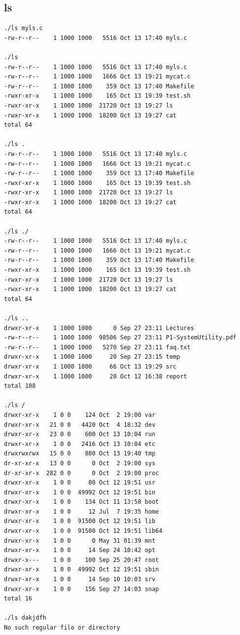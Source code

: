 \documentclass[11pt]{article}
\begin{document}
\subsection{ls}
\label{sec:org6e01d4c}
\begin{verbatim}
./ls myls.c
-rw-r--r--    1 1000 1000   5516 Oct 13 17:40 myls.c

./ls
-rw-r--r--    1 1000 1000   5516 Oct 13 17:40 myls.c
-rw-r--r--    1 1000 1000   1666 Oct 13 19:21 mycat.c
-rw-r--r--    1 1000 1000    359 Oct 13 17:40 Makefile
-rwxr-xr-x    1 1000 1000    165 Oct 13 19:39 test.sh
-rwxr-xr-x    1 1000 1000  21720 Oct 13 19:27 ls
-rwxr-xr-x    1 1000 1000  18200 Oct 13 19:27 cat
total 64

./ls .
-rw-r--r--    1 1000 1000   5516 Oct 13 17:40 myls.c
-rw-r--r--    1 1000 1000   1666 Oct 13 19:21 mycat.c
-rw-r--r--    1 1000 1000    359 Oct 13 17:40 Makefile
-rwxr-xr-x    1 1000 1000    165 Oct 13 19:39 test.sh
-rwxr-xr-x    1 1000 1000  21720 Oct 13 19:27 ls
-rwxr-xr-x    1 1000 1000  18200 Oct 13 19:27 cat
total 64

./ls ./
-rw-r--r--    1 1000 1000   5516 Oct 13 17:40 myls.c
-rw-r--r--    1 1000 1000   1666 Oct 13 19:21 mycat.c
-rw-r--r--    1 1000 1000    359 Oct 13 17:40 Makefile
-rwxr-xr-x    1 1000 1000    165 Oct 13 19:39 test.sh
-rwxr-xr-x    1 1000 1000  21720 Oct 13 19:27 ls
-rwxr-xr-x    1 1000 1000  18200 Oct 13 19:27 cat
total 64

./ls ..
drwxr-xr-x    1 1000 1000      0 Sep 27 23:11 Lectures
-rw-r--r--    1 1000 1000  98506 Sep 27 23:11 P1-SystemUtility.pdf
-rw-r--r--    1 1000 1000   5270 Sep 27 23:11 faq.txt
drwxr-xr-x    1 1000 1000     20 Sep 27 23:15 temp
drwxr-xr-x    1 1000 1000     66 Oct 13 19:29 src
drwxr-xr-x    1 1000 1000     20 Oct 12 16:38 report
total 108

./ls /
drwxr-xr-x    1 0 0    124 Oct  2 19:00 var
drwxr-xr-x   21 0 0   4420 Oct  4 18:32 dev
drwxr-xr-x   23 0 0    600 Oct 13 10:04 run
drwxr-xr-x    1 0 0   2416 Oct 13 10:04 etc
drwxrwxrwx   15 0 0    880 Oct 13 19:40 tmp
dr-xr-xr-x   13 0 0      0 Oct  2 19:00 sys
dr-xr-xr-x  282 0 0      0 Oct  2 19:00 proc
drwxr-xr-x    1 0 0     80 Oct 12 19:51 usr
drwxr-xr-x    1 0 0  49992 Oct 12 19:51 bin
drwxr-xr-x    1 0 0    134 Oct 11 13:58 boot
drwxr-xr-x    1 0 0     12 Jul  7 19:35 home
drwxr-xr-x    1 0 0  91500 Oct 12 19:51 lib
drwxr-xr-x    1 0 0  91500 Oct 12 19:51 lib64
drwxr-xr-x    1 0 0      0 May 31 01:39 mnt
drwxr-xr-x    1 0 0     14 Sep 24 10:42 opt
drwxr-x---    1 0 0    100 Sep 25 20:47 root
drwxr-xr-x    1 0 0  49992 Oct 12 19:51 sbin
drwxr-xr-x    1 0 0     14 Sep 10 10:03 srv
drwxr-xr-x    1 0 0    156 Sep 27 14:03 snap
total 16

./ls dakjdfh
No such regular file or directory
\end{verbatim}
\end{document}
